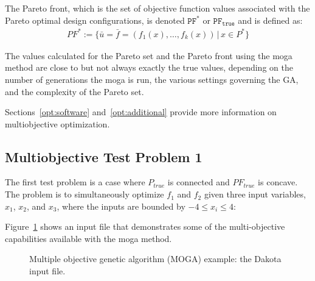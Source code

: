 The Pareto front, which is the set of objective function values
associated with the Pareto optimal design configurations, is denoted
$\mathtt{PF^*}$ or $\mathtt{PF_{true}}$ and is defined as:
\begin{eqnarray*}
  PF^*:=\{\bar{u}=\bar{f}=(f_1(x),\ldots,f_k(x))\,|\, x\in P^*\}
\end{eqnarray*}

The values calculated for the Pareto set and the Pareto front using
the moga method are close to but not always exactly the true values,
depending on the number of generations the moga is run, the various
settings governing the GA, and the complexity of the Pareto set.

Sections~\ref{opt:software} and~\ref{opt:additional} provide more
information on multiobjective optimization.


\subsection{Multiobjective Test Problem 1}\label{additional:multiobjective:problem1}

The first test problem is a case where $P_{true}$ is connected and
$PF_{true}$ is concave. The problem is to simultaneously optimize
$f_1$ and $f_2$ given three input variables, $x_1$, $x_2$, and
$x_3$, where the inputs are bounded by $-4 \leq x_{i} \leq 4$:

Figure~\ref{additional:moga1inp} shows an input file that
demonstrates some of the multi-objective capabilities available with
the moga method.
\begin{figure}[htp!]
  \centering
  \begin{bigbox}
    \begin{small}
    \end{small}
  \end{bigbox}
  \caption{Multiple objective genetic algorithm (MOGA) example: the
    Dakota input file.}
  \label{additional:moga1inp}
\end{figure}

